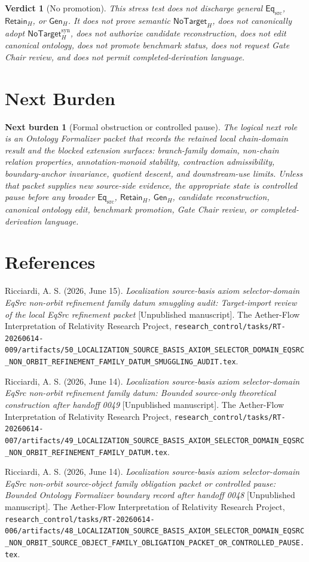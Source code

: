 \documentclass[11pt]{article}
\newcommand{\EqSrc}{\mathsf{Eq}_{\mathrm{src}}}
\newcommand{\RetainH}{\mathsf{Retain}_{H}}
\newcommand{\GenH}{\mathsf{Gen}_{H}}
\newcommand{\NoTargetH}{\mathsf{NoTarget}_{H}}
\newcommand{\NoTargetSyn}{\mathsf{NoTarget}_{H}^{\mathrm{syn}}}
\newtheorem{verdict}{Verdict}
\newtheorem{nextburden}{Next burden}
\begin{document}
\begin{verdict}[No promotion]
This stress test does not discharge general \(\EqSrc\), \(\RetainH\), or
\(\GenH\). It does not prove semantic \(\NoTargetH\), does not
canonically adopt \(\NoTargetSyn\), does not authorize candidate
reconstruction, does not edit canonical ontology, does not promote
benchmark status, does not request Gate Chair review, and does not permit
completed-derivation language.
\end{verdict}

\section{Next Burden}

\begin{nextburden}[Formal obstruction or controlled pause]
The logical next role is an Ontology Formalizer packet that records the
retained local chain-domain result and the blocked extension surfaces:
branch-family domain, non-chain relation properties, annotation-monoid
stability, contraction admissibility, boundary-anchor invariance,
quotient descent, and downstream-use limits. Unless that packet supplies
new source-side evidence, the appropriate state is controlled pause
before any broader \(\EqSrc\), \(\RetainH\), \(\GenH\), candidate
reconstruction, canonical ontology edit, benchmark promotion, Gate Chair
review, or completed-derivation language.
\end{nextburden}

\section*{References}

Ricciardi, A. S. (2026, June 15). \emph{Localization source-basis axiom
selector-domain EqSrc non-orbit refinement family datum smuggling audit:
Target-import review of the local EqSrc refinement packet} [Unpublished
manuscript]. The Aether-Flow Interpretation of Relativity Research
Project,
\texttt{research\_control/tasks/RT-20260614-009/artifacts/50\_LOCALIZATION\_SOURCE\_BASIS\_AXIOM\_SELECTOR\_DOMAIN\_EQSRC\_NON\_ORBIT\_REFINEMENT\_FAMILY\_DATUM\_SMUGGLING\_AUDIT.tex}.

Ricciardi, A. S. (2026, June 14). \emph{Localization source-basis axiom
selector-domain EqSrc non-orbit refinement family datum: Bounded
source-only theoretical construction after handoff 0049} [Unpublished
manuscript]. The Aether-Flow Interpretation of Relativity Research
Project,
\texttt{research\_control/tasks/RT-20260614-007/artifacts/49\_LOCALIZATION\_SOURCE\_BASIS\_AXIOM\_SELECTOR\_DOMAIN\_EQSRC\_NON\_ORBIT\_REFINEMENT\_FAMILY\_DATUM.tex}.

Ricciardi, A. S. (2026, June 14). \emph{Localization source-basis axiom
selector-domain EqSrc non-orbit source-object family obligation packet or
controlled pause: Bounded Ontology Formalizer boundary record after
handoff 0048} [Unpublished manuscript]. The Aether-Flow Interpretation
of Relativity Research Project,
\texttt{research\_control/tasks/RT-20260614-006/artifacts/48\_LOCALIZATION\_SOURCE\_BASIS\_AXIOM\_SELECTOR\_DOMAIN\_EQSRC\_NON\_ORBIT\_SOURCE\_OBJECT\_FAMILY\_OBLIGATION\_PACKET\_OR\_CONTROLLED\_PAUSE.tex}.
\end{document}
